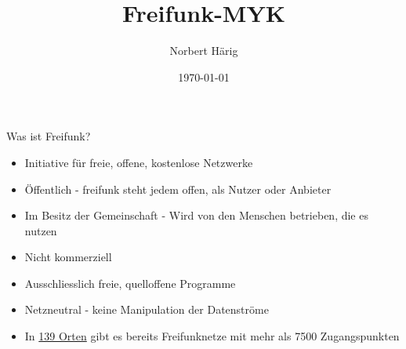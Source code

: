 \documentclass[c]{beamer}
\title{Freifunk-MYK}
\author{Norbert Härig}
\date{\today}
\begin{document}
\maketitle

\begin{frame}{Was ist Freifunk?}
	\begin{itemize}
		\item Initiative für freie, offene, kostenlose Netzwerke
		\item Öffentlich - freifunk steht jedem offen, als Nutzer oder Anbieter
		\item Im Besitz der Gemeinschaft - Wird von den Menschen betrieben, die es nutzen
		\item Nicht kommerziell
		\item Ausschliesslich freie, quelloffene Programme
		\item Netzneutral - keine Manipulation der Datenströme
		\item In  \href{http://freifunk.net/wie-mache-ich-mit/community-finden/}{139 Orten} gibt es bereits Freifunknetze mit mehr als 7500 Zugangspunkten
	\end{itemize}
\end{frame}
\end{document}
